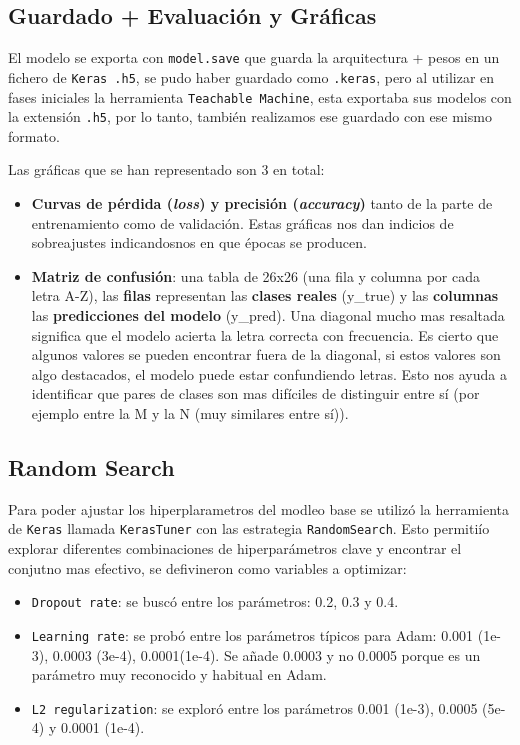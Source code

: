 \subsection{Guardado + Evaluación y Gráficas}
El modelo se exporta con \texttt{model.save} que guarda la arquitectura + pesos en un fichero de \texttt{Keras .h5}, se pudo haber guardado como \texttt{.keras}, pero al utilizar en fases iniciales la herramienta \texttt{Teachable Machine}, esta exportaba sus modelos con la extensión \texttt{.h5}, por lo tanto, también realizamos ese guardado con ese mismo formato.

Las gráficas que se han representado son 3 en total:
\begin{itemize}
    \item \textbf{Curvas de pérdida (\textit{loss}) y precisión (\textit{accuracy})} tanto de la parte de entrenamiento como de validación. Estas gráficas nos dan indicios de sobreajustes indicandosnos en que épocas se producen.
    
    \item \textbf{Matriz de confusión}: una tabla de 26x26 (una fila y columna por cada letra A-Z), las \textbf{filas} representan las \textbf{clases reales} (y\_true) y las \textbf{columnas} las \textbf{predicciones del modelo} (y\_pred). Una diagonal mucho mas resaltada significa que el modelo acierta la letra correcta con frecuencia. Es cierto que algunos valores se pueden encontrar fuera de la diagonal, si estos valores son algo destacados, el modelo puede estar confundiendo letras. Esto nos ayuda a identificar que pares de clases son mas difíciles de distinguir entre sí (por ejemplo entre la M y la N (muy similares entre sí)).
\end{itemize}



\subsection{Random Search}
Para poder ajustar los hiperplarametros del modleo base se utilizó la herramienta de \texttt{Keras} llamada \texttt{KerasTuner} con las estrategia \texttt{RandomSearch}. Esto permitiío explorar diferentes combinaciones de hiperparámetros clave y encontrar el conjutno mas efectivo, se defivineron como variables a optimizar:

\begin{itemize}
    \item \texttt{Dropout rate}: se buscó entre los parámetros: 0.2, 0.3 y 0.4.
    \item \texttt{Learning rate}: se probó entre los parámetros típicos para Adam: 0.001 (1e-3), 0.0003 (3e-4), 0.0001(1e-4). Se añade 0.0003 y no 0.0005 porque es un parámetro muy reconocido y habitual en Adam.
    \item \texttt{L2 regularization}: se exploró entre los parámetros 0.001 (1e-3), 0.0005 (5e-4) y 0.0001 (1e-4).
\end{itemize}

